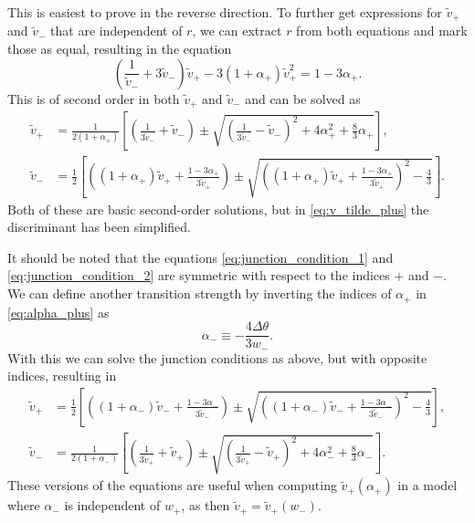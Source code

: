 This is easiest to prove in the reverse direction.
To further get expressions for $\tilde{v}_+$ and $\tilde{v}_-$ that are independent of $r$, we can extract $r$ from both equations and mark those as equal, resulting in the equation
\begin{equation}
\left( \frac{1}{\tilde{v}_-} + 3 \tilde{v}_- \right) \tilde{v}_+ - 3(1+\alpha_+)\tilde{v}_+^2 = 1 - 3\alpha_+.
\end{equation}
This is of second order in both $\tilde{v}_+$ and $\tilde{v}_-$ and can be solved as \cite[eq. B.6, B.7]{hindmarsh_gw_pt_2019}
\begin{align}
\tilde{v}_+ &= \frac{1}{2(1+\alpha_+)}\left[ \left(\frac{1}{3\tilde{v}_-}+\tilde{v}_-\right) \pm \sqrt{\left(\frac{1}{3\tilde{v}_-} - \tilde{v}_- \right)^2 + 4\alpha_+^2 + \frac{8}{3} \alpha_+} \right],
\label{eq:v_tilde_plus}
\\
\tilde{v}_- &= \frac{1}{2} \left[ \left( (1+\alpha_+)\tilde{v}_+ + \frac{1-3\alpha_+}{3\tilde{v}_+} \right) \pm \sqrt{\left((1+\alpha_+)\tilde{v}_+ + \frac{1-3\alpha_+}{3\tilde{v}_+} \right)^2 - \frac{4}{3}} \right].
\label{eq:v_tilde_minus}
\end{align}
Both of these are basic second-order solutions, but in \eqref{eq:v_tilde_plus} the discriminant has been simplified.

It should be noted that the equations \ref{eq:junction_condition_1} and \ref{eq:junction_condition_2} are symmetric with respect to the indices $+$ and $-$.
We can define another transition strength by inverting the indices of $\alpha_+$ in \ref{eq:alpha_plus} as
\begin{equation}
\alpha_- \equiv - \frac{4 \Delta \theta}{3 w_-}.
\end{equation}
With this we can solve the junction conditions as above, but with opposite indices, resulting in
\begin{align}
\tilde{v}_+ &= \frac{1}{2} \left[ \left( (1+\alpha_-)\tilde{v}_- + \frac{1-3\alpha_-}{3\tilde{v}_-} \right) \pm \sqrt{\left((1+\alpha_-)\tilde{v}_- + \frac{1-3\alpha_-}{3\tilde{v}_-} \right)^2 - \frac{4}{3}} \right],
\label{eq:v_tilde_plus_reverse}
\\
\tilde{v}_- &= \frac{1}{2(1+\alpha_-)}\left[ \left(\frac{1}{3\tilde{v}_+}+\tilde{v}_+\right) \pm \sqrt{\left(\frac{1}{3\tilde{v}_+} - \tilde{v}_+ \right)^2 + 4\alpha_-^2 + \frac{8}{3} \alpha_-} \right].
\label{eq:v_tilde_minus_reverse}
\end{align}
These versions of the equations are useful when computing $\tilde{v}_+(\alpha_+)$ in a model where $\alpha_-$ is independent of $w_+$, as then $\tilde{v}_+ = \tilde{v}_+(w_-)$.

